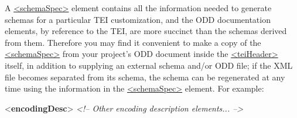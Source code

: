 A \hyperref[TEI.schemaSpec]{<schemaSpec>} element contains all the information needed to generate schemas for a particular TEI customization, and the ODD documentation elements, by reference to the TEI, are more succinct than the schemas derived from them. Therefore you may find it convenient to make a copy of the \hyperref[TEI.schemaSpec]{<schemaSpec>} from your project's ODD document inside the \hyperref[TEI.teiHeader]{<teiHeader>} itself, in addition to supplying an external schema and/or ODD file; if the XML file becomes separated from its schema, the schema can be regenerated at any time using the information in the \hyperref[TEI.schemaSpec]{<schemaSpec>} element. For example: \par\bgroup{}\exampleFont \begin{shaded}\noindent\mbox{}{<\textbf{encodingDesc}>}\mbox{}\newline 
\textit{<!-- Other encoding description elements... -->}\mbox{}\newline 
{}\mbox{}\newline 
\hspace*{1em}\mbox{}\newline 
\hspace*{1em}\mbox{}\newline 

\end{shaded}
